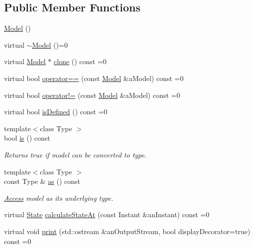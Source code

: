 \subsection*{Public Member Functions}
\begin{DoxyCompactItemize}
\item 
\hyperlink{classlibrary_1_1astro_1_1trajectory_1_1_model_a083bde3f2c8d3d1406220ad3e2dd9cd9}{Model} ()
\item 
virtual \hyperlink{classlibrary_1_1astro_1_1trajectory_1_1_model_abd305caa6adde24bf7ee2eb93e0639d1}{$\sim$\+Model} ()=0
\item 
virtual \hyperlink{classlibrary_1_1astro_1_1trajectory_1_1_model}{Model} $\ast$ \hyperlink{classlibrary_1_1astro_1_1trajectory_1_1_model_ad6181e14aea57534897e7446a2a27578}{clone} () const =0
\item 
virtual bool \hyperlink{classlibrary_1_1astro_1_1trajectory_1_1_model_a83c52eb23e8feea58d600c87700ed923}{operator==} (const \hyperlink{classlibrary_1_1astro_1_1trajectory_1_1_model}{Model} \&a\+Model) const =0
\item 
virtual bool \hyperlink{classlibrary_1_1astro_1_1trajectory_1_1_model_a476c234f5fca1eb75f64f5a96fd83c61}{operator!=} (const \hyperlink{classlibrary_1_1astro_1_1trajectory_1_1_model}{Model} \&a\+Model) const =0
\item 
virtual bool \hyperlink{classlibrary_1_1astro_1_1trajectory_1_1_model_a9b55db62f22c3493313661bacd9f7c1b}{is\+Defined} () const =0
\item 
{\footnotesize template$<$class Type $>$ }\\bool \hyperlink{classlibrary_1_1astro_1_1trajectory_1_1_model_ad8444d9fcab4f6a95d42fca5d397fe0f}{is} () const
\begin{DoxyCompactList}\small\item\em Returns true if model can be converted to type. \end{DoxyCompactList}\item 
{\footnotesize template$<$class Type $>$ }\\const Type \& \hyperlink{classlibrary_1_1astro_1_1trajectory_1_1_model_a6f03598834d74ef1e03ce3469e892e6c}{as} () const
\begin{DoxyCompactList}\small\item\em \hyperlink{classlibrary_1_1astro_1_1_access}{Access} model as its underlying type. \end{DoxyCompactList}\item 
virtual \hyperlink{classlibrary_1_1astro_1_1trajectory_1_1_state}{State} \hyperlink{classlibrary_1_1astro_1_1trajectory_1_1_model_acee9ee770c2ee1d1205b618e8f722ba4}{calculate\+State\+At} (const Instant \&an\+Instant) const =0
\item 
virtual void \hyperlink{classlibrary_1_1astro_1_1trajectory_1_1_model_af3dd0c38fdbac0b64f689fd8c88c3320}{print} (std\+::ostream \&an\+Output\+Stream, bool display\+Decorator=true) const =0
\end{DoxyCompactItemize}
